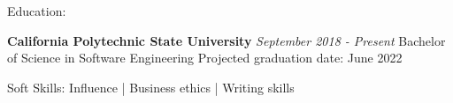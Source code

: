 \documentclass{resume3}%
\begin{document}
%
\normalsize%
\begin{flushleft}%
\newcommand{\EducationEntry}[1]{
                            {\bf\italic California Polytechnic State University\linebreak }
                            {\em September {#1} - Present}
                        }%
\newcommand{\BoldHeading}[1]{
                            {\bf{#1}}
                        }%
\newcommand{\DatedEntry}[2]{
                            \bf\item\fbox{#1} 
                            ->
                            {\bf\em{#2}}
                        }%
\newcommand{\FirstDatedEntry}[2]{
                            \bf\text\fbox{#1} 
                            ->
                            {\bf\em{#2}}
                        }%
\begin{rSection}{Education:}%
\EducationEntry{2018}%
\linebreak%
Bachelor of Science in Software Engineering%
\linebreak%
Projected graduation date: June 2022%
\end{rSection}%
\begin{rSection}{Soft Skills:}%
Influence |  Business ethics |  Writing skills%
\end{rSection}%
\end{flushleft}%
\end{document}
